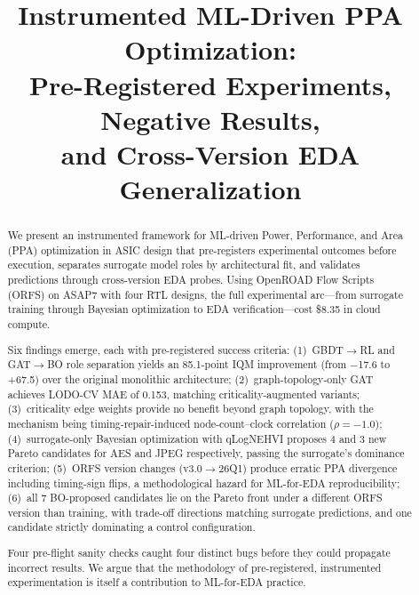 \documentclass[conference]{IEEEtran}
\begin{document}
\title{Instrumented ML-Driven PPA Optimization:\\Pre-Registered Experiments, Negative Results,\\and Cross-Version EDA Generalization}

\author{
}

\maketitle

\begin{abstract}
We present an instrumented framework for ML-driven Power, Performance, and Area (PPA)
optimization in ASIC design that pre-registers experimental outcomes before execution,
separates surrogate model roles by architectural fit, and validates predictions through
cross-version EDA probes. Using OpenROAD Flow Scripts (ORFS) on ASAP7 with four RTL
designs, the full experimental arc—from surrogate training through Bayesian optimization
to EDA verification—cost \$8.35 in cloud compute.

Six findings emerge, each with pre-registered success criteria: (1)~GBDT$\rightarrow$RL
and GAT$\rightarrow$BO role separation yields an 85.1-point IQM improvement (from
$-$17.6 to +67.5) over the original monolithic architecture; (2)~graph-topology-only GAT achieves LODO-CV MAE of
0.153, matching criticality-augmented variants; (3)~criticality edge weights provide no
benefit beyond graph topology, with the mechanism being timing-repair-induced
node-count--clock correlation ($\rho{=}{-}1.0$); (4)~surrogate-only Bayesian optimization with
qLogNEHVI proposes 4 and 3 new Pareto candidates for AES and JPEG
respectively, passing the surrogate's dominance criterion; (5)~ORFS version changes (v3.0$\rightarrow$26Q1) produce erratic PPA
divergence including timing-sign flips, a methodological hazard for ML-for-EDA
reproducibility; (6)~all 7 BO-proposed candidates lie on the Pareto front under a
different ORFS version than training, with trade-off directions matching surrogate
predictions, and one candidate strictly dominating a control configuration.

Four pre-flight sanity checks caught four distinct bugs before they could propagate
incorrect results. We argue that the methodology of pre-registered, instrumented
experimentation is itself a contribution to ML-for-EDA practice.
\end{abstract}
\end{document}
